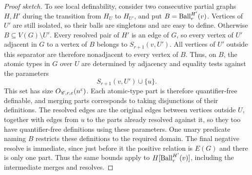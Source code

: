 \begin{proof}[Proof sketch]
To see local definability, consider two consecutive partial graphs $H,H'$ during the transition from $H_U$ to $H_{U'}$, and put $B=\operatorname{Ball}^{H'}_r(v)$.
Vertices of $U'$ are still isolated, so their balls are singletons and are easy to define.
Otherwise $B\subseteq V(G)\setminus U'$. Every resolved pair of $H'$ is an edge of $G$, so every vertex of $U'$ adjacent in $G$ to a vertex of $B$ belongs to $S_{r+1}(v,U')$.
All vertices of $U'$ outside this separator are therefore nonadjacent to every vertex of $B$.
Thus, on $B$, the atomic types in $G$ over $U$ are determined by adjacency and equality tests against the parameters
\[
S_{r+1}(v,U')\cup\{u\}.
\]
This set has size $O_{\mathscr C,r,\varepsilon}(n^\varepsilon)$.
Each atomic-type part is therefore quantifier-free definable, and merging parts corresponds to taking disjunctions of their definitions.
The resolved edges are the original edges between vertices outside $U$, together with edges from $u$ to the parts already resolved against it, so they too have quantifier-free definitions using these parameters.
One unary predicate naming $B$ restricts these definitions to the required domain.
The final negative resolve is immediate, since just before it the positive relation is $E(G)$ and there is only one part.
Thus the same bounds apply to $H[\operatorname{Ball}^{H'}_r(v)]$, including the intermediate merges and resolves.
\end{proof}
